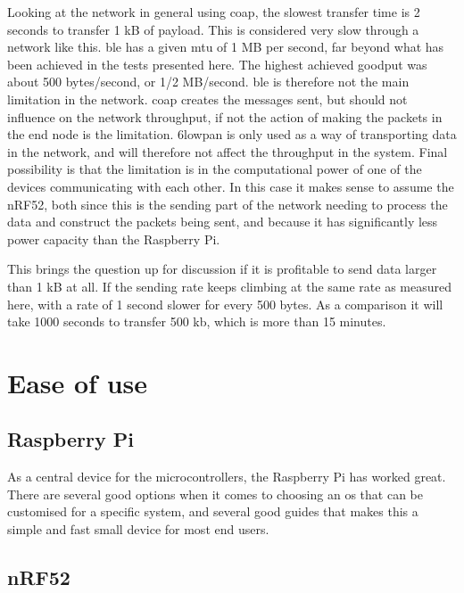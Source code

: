 \noindent Looking at the network in general using \gls{coap}, the slowest transfer time is 2 seconds to transfer 1 kB of \gls{payload}. This is considered very slow through a network like this. \gls{ble} has a given \gls{mtu} of 1 MB per second, far beyond what has been achieved in the tests presented here. The highest achieved \gls{goodput} was about 500 bytes/second, or 1/2 MB/second. \gls{ble} is therefore not the main limitation in the network. \gls{coap} creates the messages sent, but should not influence on the network throughput, if not the action of making the packets in the end node is the limitation. \gls{6lowpan} is only used as a way of transporting data in the network, and will therefore not affect the throughput in the system. Final possibility is that the limitation is in the computational power of one of the devices communicating with each other. In this case it makes sense to assume the \gls{nRF52}, both since this is the sending part of the network needing to process the data and construct the packets being sent, and because it has significantly less power capacity than the \gls{Raspberry Pi}.

\noindent This brings the question up for discussion if it is profitable to send data larger than 1 kB at all. If the sending rate keeps climbing at the same rate as measured here, with a rate of 1 second slower for every 500 bytes. As a comparison it will take 1000 seconds to transfer 500 kb, which is more than 15 minutes. 


\section{Ease of use}


\subsection{Raspberry Pi}

As a central device for the \glspl{microcontroller}, the \gls{Raspberry Pi} has worked great. There are several good options when it comes to choosing an \gls{os} that can be customised for a specific system, and several good guides that makes this a simple and fast small device for most end users. 


\subsection{nRF52}

